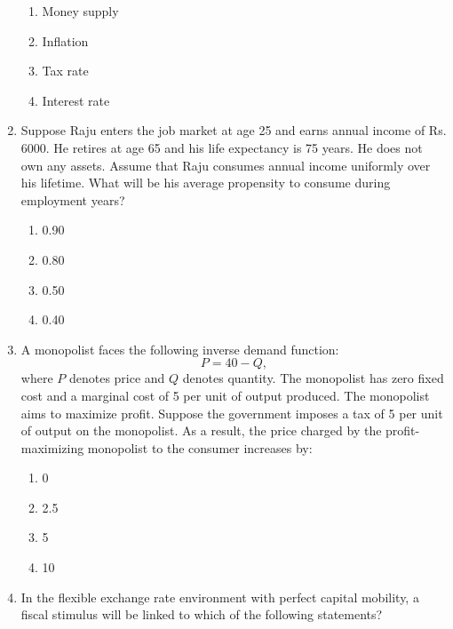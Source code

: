\documentclass[journal,12pt,onecolumn]{exam}
\theoremstyle{remark}
\begin{document}
\begin{enumerate}
  \begin{enumerate}
    \item Money supply
    \item Inflation
    \item Tax rate
    \item Interest rate
  \end{enumerate}

  \item Suppose Raju enters the job market at age 25 and earns annual income of Rs. 6000. He retires at age 65 and his life expectancy is 75 years. He does not own any assets. Assume that Raju consumes annual income uniformly over his lifetime. What will be his average propensity to consume during employment years?

  \begin{enumerate}
    \item 0.90
    \item 0.80
    \item 0.50
    \item 0.40
  \end{enumerate}

  \item A monopolist faces the following inverse demand function:
  \[
    P = 40 - Q,
  \]
  where \(P\) denotes price and \(Q\) denotes quantity. The monopolist has zero fixed cost and a marginal cost of 5 per unit of output produced. The monopolist aims to maximize profit. Suppose the government imposes a tax of 5 per unit of output on the monopolist. As a result, the price charged by the profit-maximizing monopolist to the consumer increases by:

  \begin{enumerate}
    \item 0
    \item 2.5
    \item 5
    \item 10
  \end{enumerate}
  \newpage

  \item In the flexible exchange rate environment with perfect capital mobility, a fiscal stimulus will be linked to which of the following statements?


\end{enumerate}
\end{document}
